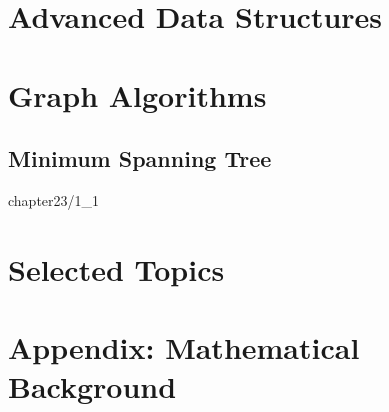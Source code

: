 \documentclass [11pt]{book}
\begin{document}

\part {Advanced Data Structures}


\part {Graph Algorithms}

\chapter {Minimum Spanning Tree}

 {chapter23/1_1}


\part {Selected Topics}


\part {Appendix: Mathematical Background}
\end{document}

